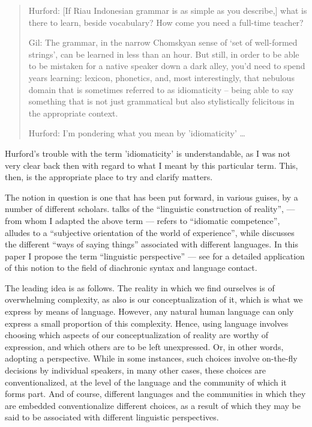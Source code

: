 \documentclass[output=paper,colorlinks,citecolor=brown
]{langscibook}
\begin{document}
\begin{quote}
    Hurford:	[If Riau Indonesian grammar is as simple as you describe,] what is there to learn, beside vocabulary? How come you need a full-time teacher?

    Gil: The grammar, in the narrow Chomskyan sense of ‘set of well-formed strings’, can be learned in less than an hour. But still, in order to be able to be mistaken for a native speaker down a dark alley, you’d need to spend years learning: lexicon, phonetics, and, most interestingly, that nebulous domain that is sometimes referred to as idiomaticity – being able to say something that is not just grammatical but also stylistically felicitous in the appropriate context.

    Hurford:	I'm pondering what you mean by 'idiomaticity'  \ldots 
\end{quote}

Hurford's trouble with the term 'idiomaticity' is understandable, as I was not very clear back then with regard to what I meant by this particular term.  This, then, is the appropriate place to try and clarify matters.

The notion in question is one that has been put forward, in various guises, by a number of different
scholars. \citet{grace1987linguistic} talks of the ``linguistic construction of reality'',
\citet{pawley1993language} — from whom I adapted the above term — refers to ``idiomatic competence'',
\citet[91]{slobin1996thought} alludes to a ``subjective orientation of the world of experience'',
while \citet{ross2001contact} discusses the different ``ways of saying things'' associated with
different languages.  In this paper I propose the term ``linguistic perspective'' — see \citet{gil2023recent} for a detailed application of this notion to the field of diachronic syntax and language contact.

The leading idea is as follows.  The reality in which we find ourselves is of overwhelming complexity, as also is our conceptualization of it, which is what we express by means of language.  However, any natural human language can only express a small proportion of this complexity.  Hence, using language involves choosing which aspects of our conceptualization of reality are worthy of expression, and which others are to be left unexpressed.  Or, in other words, adopting a perspective.  While in some instances, such choices involve on-the-fly decisions by individual speakers, in many other cases, these choices are conventionalized, at the level of the language and the community of which it forms part.  And of course, different languages and the communities in which they are embedded conventionalize different choices, as a result of which they may be said to be associated with different linguistic perspectives.
\end{document}
